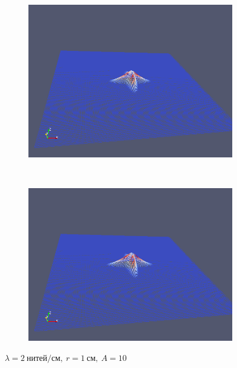 \begin{figure}[H]
\begin{subfigure}[t]{0.5\textwidth}
        \includegraphics[width=\textwidth]{img/fiber/density_2_radius_1_amplitude_10/5.png}
    \end{subfigure}%
    ~
    \begin{subfigure}[t]{0.5\textwidth}
        \centering
        \includegraphics[width=\textwidth]{img/fiber/density_2_radius_1_amplitude_10/6.png}
    \end{subfigure}
    \caption{$\lambda=2~нитей/см,~r=1~см,~A=10$}
\end{figure}
